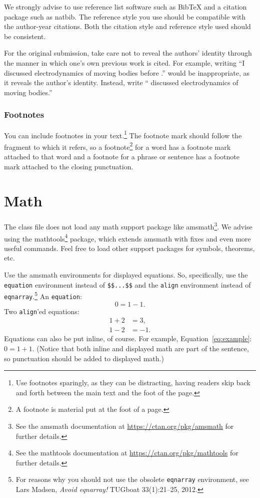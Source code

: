\documentclass{uai2023} %
\begin{document}
We strongly advise to use reference list software such as Bib\TeX{} and a citation package such as \textsf{natbib}.
The reference style you use should be compatible with the author-year citations.
Both the citation style and reference style used should be consistent.

For the original submission, take care not to reveal the authors' identity through the manner in which one's own previous work is cited.
For example, writing
“I discussed electrodynamics of moving bodies before \citep{einstein}.” would be inappropriate, as it reveals the author's identity.
Instead, write “\citet{einstein} discussed electrodynamics of moving bodies.”

\subsubsection{Footnotes}
You can include footnotes in your text.\footnote{
    Use footnotes sparingly, as they can be distracting, having readers skip back and forth between the main text and the foot of the page.
}
The footnote mark should follow the fragment to which it refers, so a footnote\footnote{
    A footnote is material put at the foot of a page.
}
for a word has a footnote mark attached to that word and a footnote for a phrase or sentence has a footnote mark attached to the closing punctuation.

\section{Math}\label{sec:math}
The class file does not load any math support package like \textsf{amsmath}\footnote{%
  See the \textsf{amsmath} documentation at \url{https://ctan.org/pkg/amsmath} for further details.
}.
We advise using the \textsf{mathtools}\footnote{%
  See the \textsf{mathtools} documentation at \url{https://ctan.org/pkg/mathtools} for further details.
}
package, which extends \textsf{amsmath} with fixes and even more useful commands.
Feel free to load other support packages for symbols, theorems, etc.

Use the \textsf{amsmath} environments for displayed equations.
So, specifically, use the \texttt{equation} environment instead of \verb|$$...$$| and the \texttt{align} environment instead of \texttt{eqnarray}.\footnote{For reasons why you should not use the obsolete \texttt{eqnarray} environment, see Lars Madsen, \textit{Avoid eqnarray!} TUGboat 33(1):21--25, 2012.}
An \texttt{equation}:
\begin{equation}\label{eq:example}
  0 = 1 - 1.
\end{equation}
Two \texttt{align}'ed equations:
\begin{align*} %
  1 + 2 &= 3,\\
  1 - 2 &= -1.
\end{align*}
Equations can also be put inline, of course.
For example, Equation~\eqref{eq:example}: \(0=1+1\). %
(Notice that both inline and displayed math are part of the sentence, so punctuation should be added to displayed math.)
\end{document}
